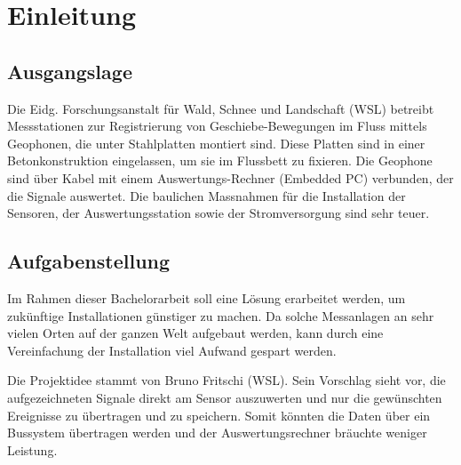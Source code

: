 %

%

\chapter{Einleitung}\label{chap.einleitung}



\section{Ausgangslage}\label{sec.ausgangslage}
Die Eidg. Forschungsanstalt für Wald, Schnee und Landschaft (WSL) betreibt Messstationen zur Registrierung von Geschiebe-Bewegungen im Fluss mittels Geophonen, die unter Stahlplatten montiert sind. Diese Platten sind in einer Betonkonstruktion eingelassen, um sie im Flussbett zu fixieren. Die Geophone sind über Kabel mit einem Auswertungs-Rechner (Embedded PC) verbunden, der die Signale auswertet. Die baulichen Massnahmen für die Installation der Sensoren, der Auswertungsstation sowie der Stromversorgung sind sehr teuer. 


\section{Aufgabenstellung}\label{sec.aufgabenstellung}
Im Rahmen dieser Bachelorarbeit soll eine Lösung erarbeitet werden, um zukünftige Installationen günstiger zu machen. Da solche Messanlagen an sehr vielen Orten auf der ganzen Welt aufgebaut werden, kann durch eine Vereinfachung der Installation viel Aufwand gespart werden. 

Die Projektidee stammt von Bruno Fritschi (WSL). Sein Vorschlag sieht vor, die aufgezeichneten Signale direkt am Sensor auszuwerten und nur die gewünschten Ereignisse zu übertragen und zu speichern. Somit könnten die Daten über ein Bussystem übertragen werden und der Auswertungsrechner bräuchte weniger Leistung.

